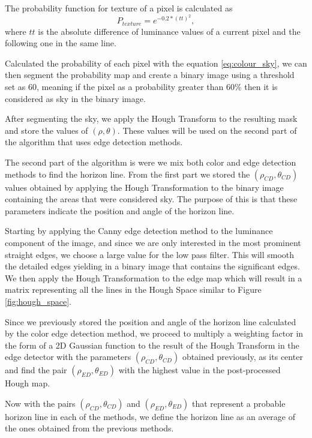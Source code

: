 The probability function for texture of a pixel is calculated as
\begin{equation}
	P_{texture} = e^{-0.2*(tt)^{2}},
\end{equation}
where $tt$ is the absolute difference of luminance values of a current pixel and the following one in the same line.

Calculated the probability of each pixel with the equation \ref{eq:colour_sky}, we can then segment the probability map and create a binary image using a threshold set as 60, meaning if the pixel as a probability greater than 60\% then it is considered as sky in the binary image.

After segmenting the sky, we apply the Hough Transform to the resulting mask and store the values of $(\rho,\theta)$. These values will be used on the second part of the algorithm that uses edge detection methods.

The second part of the algorithm is were we mix both color and edge detection methods to find the horizon line. From the first part we stored the $(\rho_{CD},\theta_{CD})$ values obtained by applying the Hough Transformation to the binary image containing the areas that were considered sky. The purpose of this is that these parameters indicate the position and angle of the horizon line.

Starting by applying the Canny edge detection method to the luminance component of the image, and since we are only interested in the most prominent straight edges, we choose a large value for the low pass filter. This will smooth the detailed edges yielding in a binary image that contains the significant edges. We then apply the Hough Transformation to the edge map which will result in a matrix representing all the lines in the Hough Space similar to Figure \ref{fig:hough_space}.

Since we previously stored the position and angle of the horizon line calculated by the color edge detection method, we proceed to multiply a weighting factor in the form of a 2D Gaussian function to the result of the Hough Transform in the edge detector with the parameters $(\rho_{CD},\theta_{CD})$ obtained previously, as its center and find the pair $(\rho_{ED}, \theta_{ED})$ with the highest value in the post-processed Hough map.

Now with the pairs $(\rho_{CD}, \theta_{CD})$ and $(\rho_{ED}, \theta_{ED})$ that represent a probable horizon line in each of the methods, we define the horizon line as an average of the ones obtained from the previous methods.

